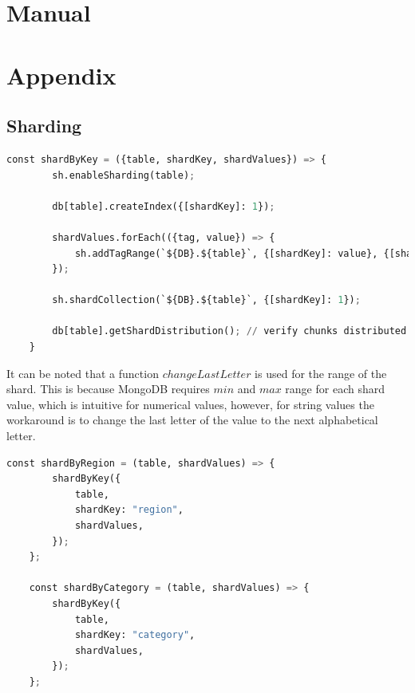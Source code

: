 \documentclass{report}
\begin{document}
    \section{Manual}

    \section{Appendix}
    \subsection{Sharding}\label{subsec:appendix-sharding}
    \begin{lstlisting}[language=python, caption=General sharding function]
    const shardByKey = ({table, shardKey, shardValues}) => {
        sh.enableSharding(table);
    
        db[table].createIndex({[shardKey]: 1});
    
        shardValues.forEach(({tag, value}) => {
            sh.addTagRange(`${DB}.${table}`, {[shardKey]: value}, {[shardKey]: changeLastLetter(value)}, tag);
        });
    
        sh.shardCollection(`${DB}.${table}`, {[shardKey]: 1});
    
        db[table].getShardDistribution(); // verify chunks distributed on shards
    }
    \end{lstlisting}
    It can be noted that a function $changeLastLetter$ is used for the range of the shard. This is because MongoDB requires $min$ and $max$ range for each shard value, which is intuitive for numerical values, however, for string values the workaround is to change the last letter of the value to the next alphabetical letter.
    \begin{lstlisting}[language=python, caption=Sharding per region and category]
    const shardByRegion = (table, shardValues) => {
        shardByKey({
            table,
            shardKey: "region",
            shardValues,
        });
    };

    const shardByCategory = (table, shardValues) => {
        shardByKey({
            table,
            shardKey: "category",
            shardValues,
        });
    };
    \end{lstlisting}
\end{document}
